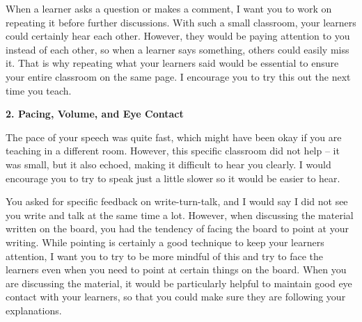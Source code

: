 \documentclass{article}
\begin{document}
When a learner asks a question or makes a comment, I want you to work on repeating it before further discussions. With such a small classroom, your learners could certainly hear each other. However, they would be paying attention to you instead of each other, so when a learner says something, others could easily miss it. That is why repeating what your learners said would be essential to ensure your entire classroom on the same page. I encourage you to try this out the next time you teach.

\textbf{2. Pacing, Volume, and Eye Contact}

The pace of your speech was quite fast, which might have been okay if you are teaching in a different room. However, this specific classroom did not help – it was small, but it also echoed, making it difficult to hear you clearly. I would encourage you to try to speak just a little slower so it would be easier to hear.

You asked for specific feedback on write-turn-talk, and I would say I did not see you write and talk at the same time a lot. However, when discussing the material written on the board, you had the tendency of facing the board to point at your writing. While pointing is certainly a good technique to keep your learners attention, I want you to try to be more mindful of this and try to face the learners even when you need to point at certain things on the board. When you are discussing the material, it would be particularly helpful to maintain good eye contact with your learners, so that you could make sure they are following your explanations.
\end{document}
